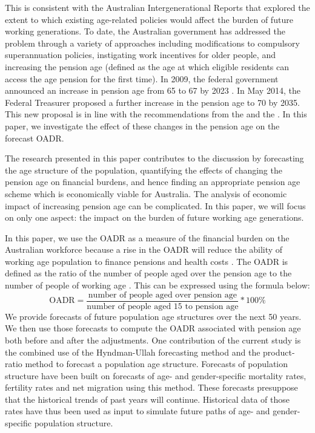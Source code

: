 \documentclass[11pt,a4paper,]{article}
\begin{document}
This is consistent with the Australian Intergenerational Reports \autocites{IGR02}{IGR07}{Swan2010} that explored the extent to which existing age-related policies would affect the burden of future working generations. To date, the Australian government has addressed the problem through a variety of approaches including modifications to compulsory superannuation policies, instigating work incentives for older people, and increasing the pension age (defined as the age at which eligible residents can access the age pension for the first time). In 2009, the federal government announced an increase in pension age from 65 to 67 by 2023 \autocite{Nielson2010}. In May 2014, the Federal Treasurer proposed a further increase in the pension age to 70 by 2035. This new proposal is in line with the recommendations from the \textcite{PC13} and the \textcite{NCOA2014}. In this paper, we investigate the effect of these changes in the pension age on the forecast OADR.

The research presented in this paper contributes to the discussion by forecasting the age structure of the population, quantifying the effects of changing the pension age on financial burdens, and hence finding an appropriate pension age scheme which is economically viable for Australia. The analysis of economic impact of increasing pension age can be complicated. In this paper, we will focus on only one aspect: the impact on the burden of future working age generations.

In this paper, we use the OADR as a measure of the financial burden on the Australian workforce because a rise in the OADR will reduce the ability of working age population to finance pensions and health costs \autocites{ARW07}{IGR02}{IGR07}. The OADR is defined as the ratio of the number of people aged over the pension age to the number of people of working age \autocite{ARW07}. This can be expressed using the formula below:
\begin{equation}
  \text{OADR} = \frac{\text{number of people aged over pension age}}{\text{number of people aged 15 to pension age}}*100\%
\end{equation}
We provide forecasts of future population age structures over the next 50 years. We then use those forecasts to compute the OADR associated with pension age both before and after the adjustments. One contribution of the current study is the combined use of the Hyndman-Ullah forecasting method \autocite{HU07} and the product-ratio method \autocite{HBY13} to forecast a population age structure. Forecasts of population structure have been built on forecasts of age- and gender-specific mortality rates, fertility rates and net migration using this method. These forecasts presuppose that the historical trends of past years will continue. Historical data of those rates have thus been used as input to simulate future paths of age- and gender-specific population structure.
\end{document}
